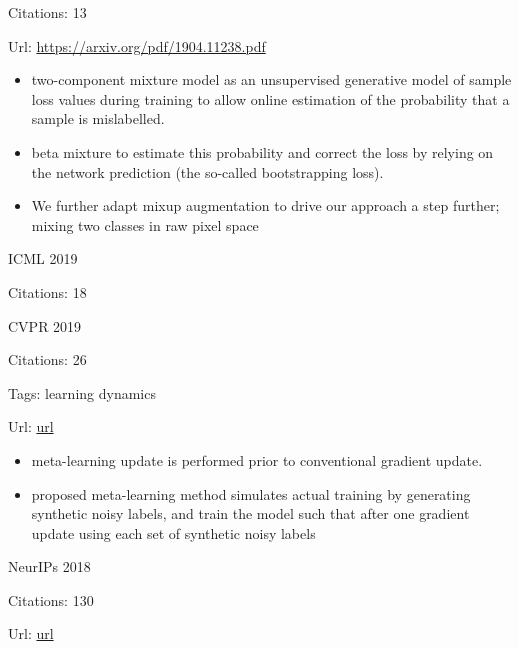 \documentclass[11pt]{article}
\begin{document}
\noindent Citations: 13

\noindent Url: \url{https://arxiv.org/pdf/1904.11238.pdf}

\begin{itemize}
  \item two-component mixture model as an unsupervised generative model of sample loss values during training to allow online estimation of the probability that a sample is mislabelled. 
  \item beta mixture to estimate this probability and correct the loss by relying on the network prediction (the so-called bootstrapping loss).
  \item We further adapt mixup augmentation to drive our approach a step further; mixing two classes in raw pixel space
\end{itemize}

\vspace{2cm}

\noindent ICML 2019

\noindent Citations: 18

\vspace{2cm}

\noindent CVPR 2019

\noindent Citations: 26

\noindent Tags: learning dynamics

\noindent Url: \href{https://arxiv.org/pdf/1812.05214.pdf}{url}

\begin{itemize}
  \item meta-learning update is performed prior to conventional gradient update.
  \item proposed meta-learning method simulates actual training by generating synthetic noisy labels, and train the model such that after one gradient update using each set of synthetic noisy labels
\end{itemize}

\vspace{2cm}

\noindent NeurIPs 2018

\noindent Citations: 130

\noindent Url: \href{https://arxiv.org/pdf/1804.06872.pdf}{url}
\end{document}
